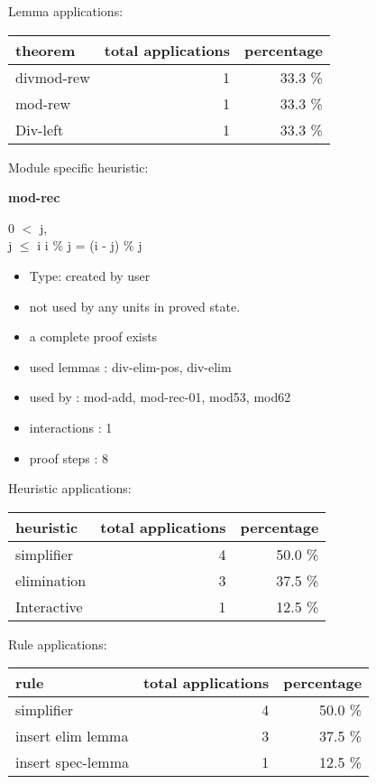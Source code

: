 \documentclass[a4paper]{article}
\begin{document}
Lemma applications:

\begin{supertabular}{l|r|r}
theorem	        & total applications & percentage \\ \hline
divmod-rew & 1 & 33.3 \% \\
mod-rew & 1 & 33.3 \% \\
Div-left & 1 & 33.3 \% \\

\end{supertabular}

Module specific heuristic:

\pagebreak

{\LARGE\bf mod-rec}\label{lemma-mod-rec}

\medskip

0 $<$ j, \\
j $\le$ i \Fol i \% j = (i - j) \% j

\begin{itemize}

\item Type: created by user

\item not used by any units in proved state.
\item       a complete proof exists
\item       used lemmas  : div-elim-pos, div-elim
\item       used by      : mod-add, mod-rec-01, mod53, mod62
\item       interactions : 1
\item       proof steps  : 8
\end{itemize}

\medskip


Heuristic applications:

\begin{supertabular}{l|r|r}
heuristic	& total applications & percentage \\ \hline
simplifier & 4 & 50.0 \% \\
elimination & 3 & 37.5 \% \\
Interactive & 1 & 12.5 \% \\

\end{supertabular}

Rule applications:

\begin{supertabular}{l|r|r}
rule	        & total applications & percentage \\ \hline
simplifier & 4 & 50.0 \% \\
insert elim lemma & 3 & 37.5 \% \\
insert spec-lemma & 1 & 12.5 \% \\

\end{supertabular}
\end{document}
